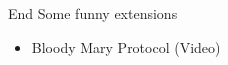 \documentclass[xcolor=svgnames,handout,aspectratio=169]{beamer}
\begin{document}
\begin{frame}
  {End}
	Some funny extensions
	\begin{itemize}
		\item Bloody Mary Protocol (Video)
	\end{itemize}

\end{frame}

%
%
%
%
%
%
%
%
%
\end{document}
